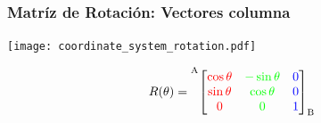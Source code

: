 \begin{frame}
    \frametitle{Matríz de Rotación: Vectores columna}

    \begin{center}
        \begin{minipage}{0.4\linewidth}
            \texttt{[image: coordinate\_system\_rotation.pdf]}
        \end{minipage}
        \hspace{1em}
        \begin{minipage}{0.5\linewidth}
            \begin{equation*}
                R(\theta) =
                \toCoord{\fromCoord{\begin{bmatrix}
                    \textcolor{red}{\cos \theta} & \textcolor{green}{-\sin \theta} & \textcolor{blue}{0}\\
                    \textcolor{red}{\sin \theta} & \textcolor{green}{\cos \theta} & \textcolor{blue}{0}\\
                    \textcolor{red}{0} & \textcolor{green}{0} & \textcolor{blue}{1}
                \end{bmatrix}}{B}}{A}
            \end{equation*}
        \end{minipage}
    \end{center}

\end{frame}

